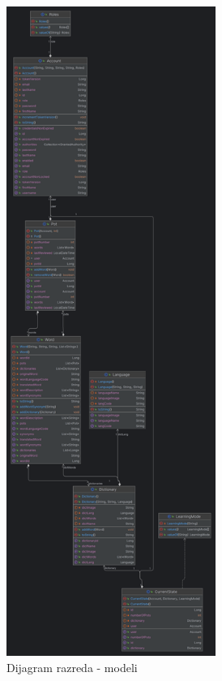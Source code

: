 			\begin{figure}[H]
				\centering
				\includegraphics[height=600pt]{slike/ClassDiagram1.PNG}
				\caption{Dijagram razreda - modeli}
				\label{fig:classDiagram1}
			\end{figure}
			
